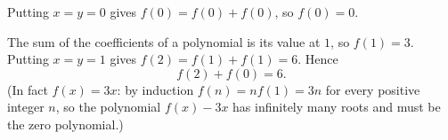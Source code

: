 Putting $x=y=0$ gives $f(0)=f(0)+f(0)$, so $f(0)=0$.

The sum of the coefficients of a polynomial is its value at $1$, so $f(1)=3$. Putting $x=y=1$ gives $f(2)=f(1)+f(1)=6$. Hence
\[f(2)+f(0)=\boxed{6}.\]
(In fact $f(x)=3x$: by induction $f(n)=nf(1)=3n$ for every positive integer $n$, so the polynomial $f(x)-3x$ has infinitely many roots and must be the zero polynomial.)
